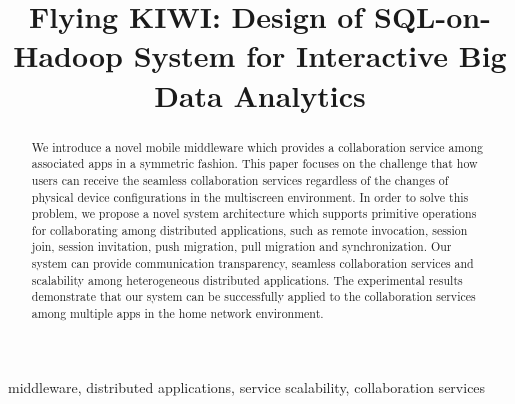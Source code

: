 \documentclass[conference]{IEEEtran}
\begin{document}
    \title{Flying KIWI: Design of SQL-on-Hadoop System for Interactive Big Data Analytics }

    \author{
 }

\maketitle

\begin{abstract}
We introduce a novel mobile middleware which provides a collaboration service among associated apps in a symmetric fashion.
This paper focuses on the challenge that how users can  receive the seamless collaboration services regardless of the changes of physical device configurations in the multiscreen environment.
In order to solve this problem, we propose a novel system architecture which supports primitive operations for collaborating among distributed applications, such as remote invocation, session join, session invitation,  push migration, pull migration and synchronization.
Our system can provide communication transparency, seamless collaboration services and scalability among heterogeneous distributed applications.
The experimental results demonstrate that our system can be successfully applied to the collaboration services among multiple apps in the home network environment.
\end{abstract}

    \begin{IEEEkeywords}
    middleware, distributed applications, service scalability, collaboration services
    \end{IEEEkeywords}
\end{document}
